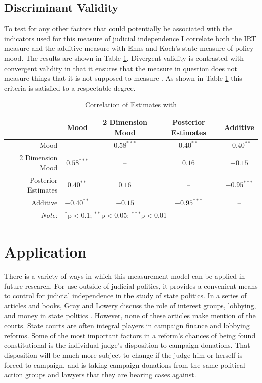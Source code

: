 \documentclass[12pt]{article}
\begin{document}
\subsection*{Discriminant Validity}
To test for any other factors that could potentially be associated with the indicators used for this measure of judicial independence I correlate both the IRT measure and the additive measure with Enns and Koch's \citeyearpar{Enns2013} state-measure of policy mood.  The results are shown in Table \ref{EKCor}.  Divergent validity is contrasted with convergent validity in that it ensures that the measure in question does not measure things that it is not supposed to measure \citep{Campbell1959,Jackman2008}.  As shown in Table \ref{EKCor} this criteria is satisfied to a respectable degree.

\begin{table}[ht]
	\centering\caption{Correlation of Estimates with \citet{Enns2013}}\label{EKCor}
	\begin{tabular}{rcccc}
		\hline
		&  Mood &  2 Dimension Mood & Posterior Estimates & Additive \\ 
		\hline
		Mood & -- & $0.58^{***}$ & $0.40^{**}$ & $-0.40^{**}$ \\ 
		2 Dimension Mood &  $0.58^{***}$ & -- & $0.16$ & $-0.15$ \\ 
		Posterior Estimates &  $0.40^{**}$  &  $0.16$  & -- & $-0.95^{***}$ \\ 
		Additive & $-0.40^{**}$  & $-0.15$  & $-0.95^{***}$ & -- \\ 
		\hline
		\textit{Note:}  & \multicolumn{4}{l}{$^{*}$p$<$0.1; $^{**}$p$<$0.05; $^{***}$p$<$0.01} \\
	\end{tabular}
\end{table}

\section{Application}\label{Application}
There is a variety of ways in which this measurement model can be applied in future research.  For use outside of judicial politics, it provides a convenient means to control for judicial independence in the study of state politics.  In a series of articles and books, Gray and Lowery discuss the role of interest groups, lobbying, and money in state politics \citep{berkhout2011timing,gray2000population,lowery1995population}.  However, none of these articles make mention of the courts.  State courts are often integral players in campaign finance and lobbying reforms.  Some of the most important factors in a reform's chances of being found constitutional is the individual judge's disposition to campaign donations.  That disposition will be much more subject to change if the judge him or herself is forced to campaign, and is taking campaign donations from the same political action groups and lawyers that they are hearing cases against.
\end{document}
